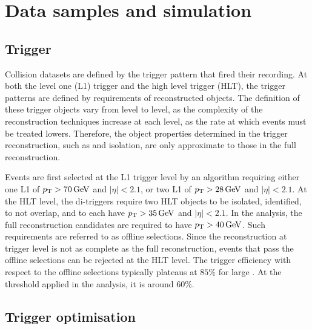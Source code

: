 \section{Data samples and simulation}
\label{sec:analysis_samples}

\subsection{Trigger}
Collision datasets are defined by the trigger pattern that fired their recording. At both the level one (L1) trigger and the high level trigger (HLT), the trigger patterns are defined by requirements of reconstructed objects. The definition of these trigger objects vary from level to level, as the complexity of the reconstruction techniques increase at each level, as the rate at which events must be treated lowers. Therefore, the object properties determined in the trigger reconstruction, such as \pt and isolation, are only approximate to those in the full reconstruction.

Events are first selected at the L1 trigger level by an algorithm requiring either one L1 \tauh of $p_{\mathrm{T}} > 70\,\mathrm{GeV}$ and $|\eta| < 2.1$, or two L1 \tauh of $p_{\mathrm{T}} > 28\,\mathrm{GeV}$ and $|\eta| < 2.1$. At the HLT level, the di-\tauh triggers require two HLT \tauh objects to be isolated, identified, to not overlap, and to each have $p_{\mathrm{T}} > 35\,\mathrm{GeV}$ and $|\eta| < 2.1$. In the analysis, the full reconstruction \tauh candidates are required to have $p_{\mathrm{T}} > 40\,\mathrm{GeV}$. Such requirements are referred to as offline selections. Since the reconstruction at trigger level is not as complete as the full reconstruction, events that pass the offline selections can be rejected at the HLT level. The trigger efficiency with respect to the offline selections typically plateaus at $85\%$ for large \tauh \pt \cite{Sirunyan_2018}. At the \pt threshold applied in the analysis, it is around $60\%$. 

\subsection{Trigger optimisation}

